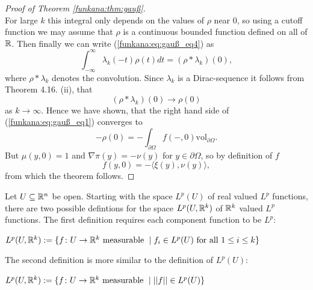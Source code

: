 \begin{proof}[Proof of Theorem \ref{funkana:thm:gauß}]
\begin{equation}
    \end{equation}
    For large $k$ this integral only depends on the values of $\rho$ near $0$, so using a cutoff function we may assume that $\rho$ is a continuous bounded function defined on all of $\mathbb{R}$. Then finally we can write (\ref{funkana:eq:gauß_eq4}) as 
    \[
    \int_{-\infty}^{\infty}\lambda_k(-t)\rho(t) dt = (\rho \ast \lambda_k)(0),
    \]  
    where $\rho \ast \lambda_k$ denotes the convolution. Since $\lambda_k$ is a Dirac-sequence it follows from \cite{schmidt_ana3} Theorem 4.16. (ii), that 
    \[
    (\rho \ast \lambda_k)(0) \to \rho(0)
    \]
    as $k\to \infty$. Hence we have shown, that the right hand side of (\ref{funkana:eq:gauß_eq1}) converges to 
    \[
    -\rho(0) = -\int_{\partial\Omega}f(-,0)\mathrm{vol}_{\partial\Omega}.
    \]
    But $\mu(y,0) = 1$ and $\nabla\pi(y) = - \nu(y)$ for $y \in \partial\Omega$, so by definition of $f$
    \[
    f(y,0) = -\langle \xi(y),\nu(y) \rangle,
    \]
    from which the theorem follows.
    
\end{proof}


Let $U \subseteq \mathbb{R}^n$ be open. Starting with the space $L^p(U)$ of real valued $L^p$ functions, there are two possible defintions for the space $L^p(U,\mathbb{R}^k)$ of $\mathbb{R}^k$ valued $L^p$ functions. The first definition requires each component function to be $L^p$:

\begin{definition}
    $L^p(U,\mathbb{R}^k) := \{f \colon U \to \mathbb{R}^k \text{ measurable } \mid f_i \in L^p(U) \text{ for all } 1 \leq i \leq k\}$
\end{definition}

The second definition is more similar to the definition of $L^p(U)$:

\begin{definition}
    $L^p(U,\mathbb{R}^k) := \{ f\colon U \to \mathbb{R}^k \text{ measurable } \mid ||f|| \in L^p(U) \}$
\end{definition}


